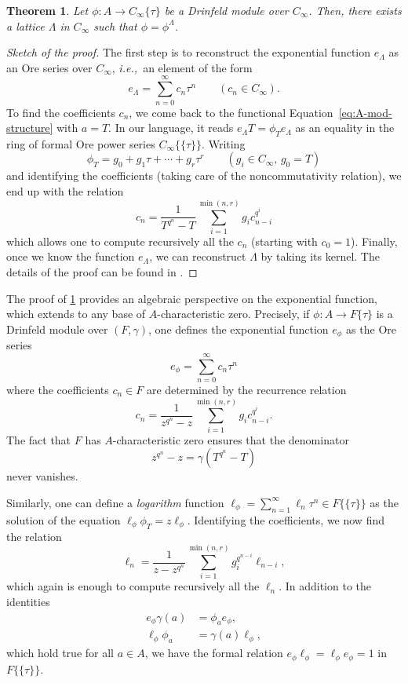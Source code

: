 \documentclass[11pt]{article}
\newtheorem{theorem}{Theorem}[section]
\theoremstyle{definition}
\newcommand{\Cinf}{C_{\infty}}
\newcommand{\ie}{\textit{i.e.,~}}
\begin{document}
\begin{theorem}
\label{th:drinfeld:uniformization}
Let $\phi : A \to \Cinf\{\tau\}$ be a Drinfeld module over $\Cinf$.
Then, there exists a lattice $\Lambda$ in $\Cinf$ such that 
$\phi = \phi^\Lambda$.
\end{theorem}

\begin{proof}[Sketch of the proof]
The first step is to reconstruct the exponential function $e_\Lambda$
as an Ore series over $\Cinf$, \ie an element of the form
$$e_\Lambda = \sum_{n=0}^\infty c_n \tau^n \qquad (c_n \in \Cinf).$$
To find the coefficients $c_n$, we come back to the functional
Equation~\eqref{eq:A-mod-structure} with $a = T$. In our language,
it reads $e_\Lambda T = \phi_T e_\Lambda$ as an equality in the ring of formal Ore power series $\Cinf\{\!\{\tau\}\!\}$.
Writing
$$\phi_T = g_0 + g_1 \tau + \cdots + g_r \tau^r \qquad 
(g_i \in \Cinf,\, g_0 =T)$$ and
identifying the coefficients (taking care of the noncommutativity
relation), we end up with the relation
$$c_n = \frac 1 {T^{q^n} - T} 
  \sum_{i=1}^{\min(n,r)} g_i c_{n-i}^{q^i}$$
which allows one to compute recursively all the $c_n$ (starting with
$c_0 = 1$). Finally, once we know the function $e_\Lambda$, we can reconstruct $\Lambda$ by taking its kernel.
The details of the proof can be found in \cite[Theorem~5.2.8]{Pap23}.
\end{proof}

The proof of \cref{th:drinfeld:uniformization} provides an algebraic perspective on the 
exponential function, which extends to any base of $A$-characteristic
zero. Precisely, if $\phi : A \to F\{\tau\}$ is a Drinfeld module 
over $(F, \gamma)$, one defines the exponential function $e_\phi$ 
as the Ore series
$$e_\phi = \sum_{n=0}^\infty c_n \tau^n$$
where the coefficients $c_n\in F$ are determined by the recurrence 
relation
$$c_n = \frac 1 {z^{q^n} - z} 
  \sum_{i=1}^{\min(n,r)} g_i c_{n-i}^{q^i}.$$
The fact that $F$ has $A$-characteristic zero ensures that the
denominator $$z^{q^n} - z = \gamma(T^{q^n} - T)$$ never vanishes.

Similarly, one can define a \emph{logarithm} function $\ell_\phi
= \sum_{n=1}^\infty \ell_n \tau^n \in F\{\!\{\tau\}\!\}$ as the 
solution of the equation 
$\ell_\phi  \phi_T = z  \ell_\phi$. Identifying the coefficients, we now find the relation
$$\ell_n = \frac 1 {z - z^{q^n}}  
  \sum_{i=1}^{\min(n,r)} g_i^{q^{n-i}} \ell_{n-i},$$
which again is enough to compute recursively all the $\ell_n$.
In addition to the identities 
\begin{align*}
e_\phi  \gamma(a) & = \phi_a  e_\phi, \\
\ell_\phi  \phi_a & = \gamma(a)  \ell_\phi,
\end{align*}
which hold true for all $a \in A$, we have the formal relation
$e_\phi \ell_\phi = \ell_\phi e_\phi = 1$ in $F\{\!\{\tau\}\!\}$.
\end{document}
